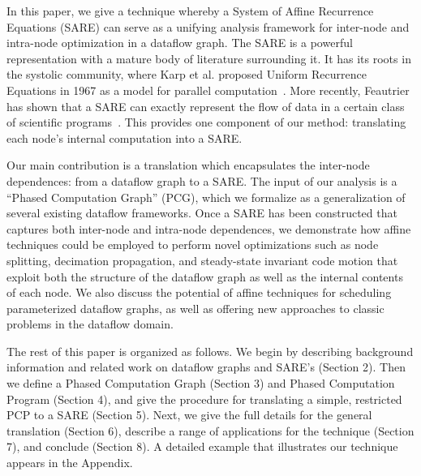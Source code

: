 In this paper, we give a technique whereby a System of Affine
Recurrence Equations (SARE) can serve as a unifying analysis framework
for inter-node and intra-node optimization in a dataflow graph.  The
SARE is a powerful representation with a mature body of literature
surrounding it.  It has its roots in the systolic community, where
Karp et al. proposed Uniform Recurrence Equations in 1967 as a model
for parallel computation~\cite{Karp67}.  More recently, Feautrier has
shown that a SARE can exactly represent the flow of data in a certain
class of scientific programs~\cite{Feautrier91,Feautrier01}.  This
provides one component of our method: translating each node's internal
computation into a SARE.

Our main contribution is a translation which encapsulates the
inter-node dependences: from a dataflow graph to a SARE.  The input of
our analysis is a ``Phased Computation Graph'' (PCG), which we
formalize as a generalization of several existing dataflow frameworks.
Once a SARE has been constructed that captures both inter-node and
intra-node dependences, we demonstrate how affine techniques could be
employed to perform novel optimizations such as node splitting,
decimation propagation, and steady-state invariant code motion that
exploit both the structure of the dataflow graph as well as the
internal contents of each node.  We also discuss the potential of
affine techniques for scheduling parameterized dataflow graphs, as
well as offering new approaches to classic problems in the dataflow
domain.

The rest of this paper is organized as follows.  We begin by
describing background information and related work on dataflow graphs
and SARE's (Section 2).  Then we define a Phased Computation Graph
(Section 3) and Phased Computation Program (Section 4), and give the
procedure for translating a simple, restricted PCP to a SARE (Section
5).  Next, we give the full details for the general translation
(Section 6), describe a range of applications for the technique
(Section 7), and conclude (Section 8).  A detailed example that
illustrates our technique appears in the Appendix.
